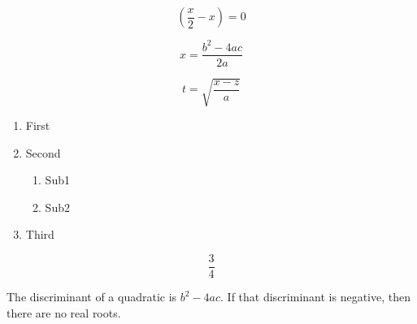 \documentclass[11pt]{article}
\begin{document}
$$\left(\frac{x}{2} - x \right) = 0$$

$$x = \frac{b^2-4ac}{2a}$$

$$t = \sqrt{\frac{x-z}{a}}$$

\begin{enumerate}
\item First
\item Second
	\begin{enumerate}
	\item Sub1
	\item Sub2
	\end{enumerate}
\item Third
\end{enumerate}

\begin{center}
$$\frac{3}{4}$$
\end{center}

The discriminant of a quadratic is $b^2 - 4ac$. If that discriminant is negative, then there are no real roots.
\end{document}
